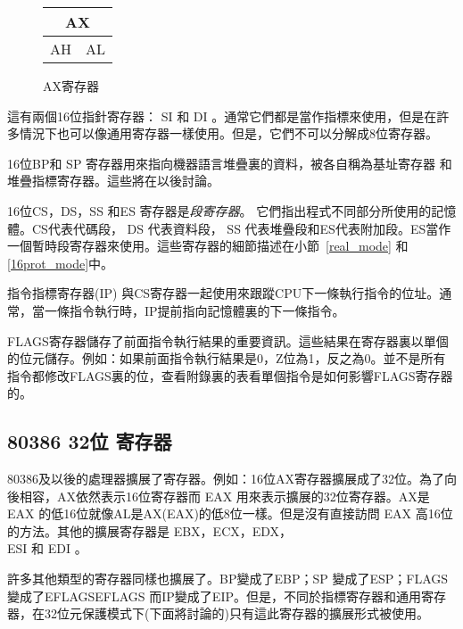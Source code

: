 \begin{figure}
\begin{center}
\begin{tabular}{cc}
\multicolumn{2}{c}{AX} \\
\hline
\multicolumn{1}{||c|}{AH} & \multicolumn{1}{c||}{AL} \\
\hline
\end{tabular}
\caption{AX寄存器 \label{fig:AX_reg} }
\end{center}
\end{figure}

這有兩個16位指針寄存器： SI 和 DI
。通常它們都是當作指標來使用，但是在許多情況下也可以像通用寄存器一樣使用。但是，它們不可以分解成8位寄存器。

16位BP和 SP
寄存器用來指向機器語言堆疊裏的資料，被各自稱為基址寄存器
和堆疊指標寄存器。這些將在以後討論。

16位CS，DS，SS 和ES 寄存器是\emph{段寄存器}。
它們指出程式不同部分所使用的記憶體。CS代表代碼段， DS 代表資料段， SS
代表堆疊段和ES代表附加段。ES當作一個暫時段寄存器來使用。這些寄存器的細節描述在小節~\ref{real_mode}
和\ref{16prot_mode}中。

指令指標寄存器(IP) 
與CS寄存器一起使用來跟蹤CPU下一條執行指令的位址。通常，當一條指令執行時，IP提前指向記憶體裏的下一條指令。

FLAGS寄存器儲存了前面指令執行結果的重要資訊。這些結果在寄存器裏以單個的位元儲存。例如：如果前面指令執行結果是0，Z位為1，反之為0。並不是所有指令都修改FLAGS裏的位，查看附錄裏的表看單個指令是如何影響FLAGS寄存器的。

\subsection{80386 32位 寄存器}

80386及以後的處理器擴展了寄存器。例如：16位AX寄存器擴展成了32位。為了向後相容，AX依然表示16位寄存器而
EAX 用來表示擴展的32位寄存器。AX是 EAX
的低16位就像AL是AX(EAX)的低8位一樣。但是沒有直接訪問 EAX
高16位的方法。其他的擴展寄存器是 EBX，ECX，EDX，\\ESI 和 EDI 。

許多其他類型的寄存器同樣也擴展了。BP變成了EBP；SP
變成了ESP；FLAGS變成了EFLAGSEFLAGS
而IP變成了EIP。但是，不同於指標寄存器和通用寄存器，在32位元保護模式下(下面將討論的)只有這此寄存器的擴展形式被使用。

